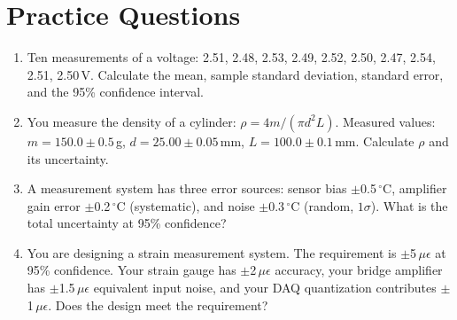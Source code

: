 \documentclass[11pt,letterpaper,twoside,openany]{book}
\newcommand{\degC}{\ensuremath{{}^{\circ}\text{C}}}
\begin{document}
\section{Practice Questions}
\begin{enumerate}[leftmargin=1.5em]
\item Ten measurements of a voltage: 2.51, 2.48, 2.53, 2.49, 2.52, 2.50, 2.47, 2.54, 2.51, 2.50\,V. Calculate the mean, sample standard deviation, standard error, and the 95\% confidence interval.
\item You measure the density of a cylinder: $\rho = 4m / (\pi d^2 L)$. Measured values: $m = 150.0 \pm 0.5$\,g, $d = 25.00 \pm 0.05$\,mm, $L = 100.0 \pm 0.1$\,mm. Calculate $\rho$ and its uncertainty.
\item A measurement system has three error sources: sensor bias $\pm$0.5\,\degC{}, amplifier gain error $\pm$0.2\,\degC{} (systematic), and noise $\pm$0.3\,\degC{} (random, $1\sigma$). What is the total uncertainty at 95\% confidence?
\item You are designing a strain measurement system. The requirement is $\pm$5\,$\mu\epsilon$ at 95\% confidence. Your strain gauge has $\pm$2\,$\mu\epsilon$ accuracy, your bridge amplifier has $\pm$1.5\,$\mu\epsilon$ equivalent input noise, and your DAQ quantization contributes $\pm$1\,$\mu\epsilon$. Does the design meet the requirement?
\end{enumerate}
\end{document}
